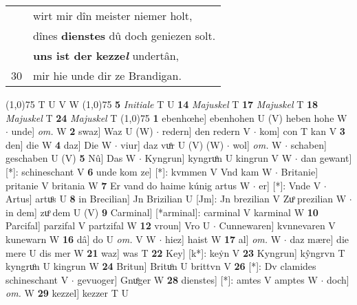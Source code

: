 \documentclass[8pt,a4paper,notitlepage]{article}
\begin{document}
\begin{table}[ht]
\begin{minipage}[t]{0.5\linewidth}
\begin{tabular}{rl}
 & wirt mir dîn meister niemer holt,\\ 
 & dînes \textbf{dienstes} dû doch geniezen solt.\\ 
 & \textbf{uns ist der kezze\textit{l}} undertân,\\ 
30 & mir hie unde dir ze Brandigan.\\ 
\end{tabular}
\scriptsize
\line(1,0){75} \newline
T U V W \newline
\line(1,0){75} \newline
\textbf{5} \textit{Initiale} T U  \textbf{14} \textit{Majuskel} T  \textbf{17} \textit{Majuskel} T  \textbf{18} \textit{Majuskel} T  \textbf{24} \textit{Majuskel} T  \newline
\line(1,0){75} \newline
\textbf{1} ebenhœhe] ebenhohen U (V) heben hohe W  $\cdot$ unde] \textit{om.} W \textbf{2} swaz] Waz U (W)  $\cdot$ redern] den redern V  $\cdot$ kom] con T kan V \textbf{3} den] die W \textbf{4} daz] Die W  $\cdot$ viur] daz vuͦr U (V) (W)  $\cdot$ wol] \textit{om.} W  $\cdot$ schaben] geschaben U (V) \textbf{5} Nû] Das W  $\cdot$ Kyngrun] kyngruͦn U kingrun V W  $\cdot$ dan gewant] [*]: schineschant V \textbf{6} unde kom ze] [*]: kvmmen V Vnd kam W  $\cdot$ Britanie] pritanie V britania W \textbf{7} Er vand do haime kúnig artus W  $\cdot$ er] [*]: Vnde V  $\cdot$ Artus] artuͦs U \textbf{8} in Brecilian] Jn Brizilian U [Jm]: Jn brezilian V Zuͦ prezilian W  $\cdot$ in dem] zuͦ dem U (V) \textbf{9} Carminal] [*arminal]: carminal V karminal W \textbf{10} Parcifal] parzifal V partzifal W \textbf{12} vroun] Vro U  $\cdot$ Cunnewaren] kvnnevaren V kunewarn W \textbf{16} dâ] do U \textit{om.} V W  $\cdot$ hiez] haist W \textbf{17} al] \textit{om.} W  $\cdot$ daz mære] die mere U dis mer W \textbf{21} waz] was T \textbf{22} Key] [k*]: keẏn V \textbf{23} Kyngrun] kŷngrvn T kyngruͦn U kingrun W \textbf{24} Britun] Brituͦn U brittvn V \textbf{26} [*]: Dv clamides schineschant V  $\cdot$ gevuoger] Gnuͦger W \textbf{28} dienstes] [*]: amtes V amptes W  $\cdot$ doch] \textit{om.} W \textbf{29} kezzel] kezzer T U \newline
\end{minipage}
\end{table}
\end{document}
